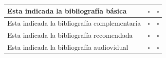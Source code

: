 \documentclass[a4paper,12pt,spanish]{article}
\begin{document}
\begin{center}
\begin{tabular}[H]{|l|l|l|}
  Esta indicada la bibliografía básica &{\Large $\square$} &{\Large $\square$} \\  \hline
  Esta indicada la bibliografía complementaria &{\Large $\square$} &{\Large $\square$} \\ \hline
  Esta indicada la bibliografía recomendada &{\Large $\square$} &{\Large $\square$}  \\ \hline 
  Esta indicada la bibliografía audiovidual &{\Large $\square$} &{\Large $\square$} \\ \hline \hline
  
\end{tabular}
\end{center}
\end{document}
